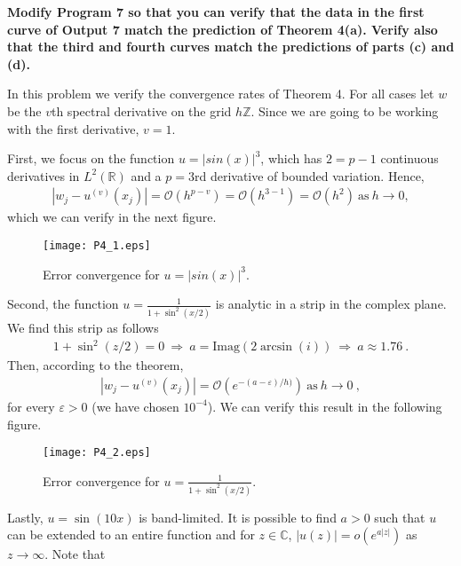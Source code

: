 \textbf{Modify Program 7 so that you can verify that the data in the first curve of Output 7 match the prediction of Theorem 4(a). Verify also that the third and fourth curves match the predictions of parts (c) and (d).}
\newline

In this problem we verify the convergence rates of Theorem 4. For all cases let $w$ be the $v$th spectral derivative on the grid $h\mathbb{Z}$. Since we are going to be working with the first derivative, $v=1$.

First, we focus on the function $u=|sin(x)|^3$, which has $2=p-1$ continuous derivatives in $L^2(\mathbb{R})$ and a $p=3$rd derivative of bounded variation. Hence,
\begin{align*}
|w_j - u^{(v)}(x_j)| = \mathcal{O}(h^{p-v}) = \mathcal{O}(h^{3-1}) = \mathcal{O}(h^{2})~\text{as}~h \rightarrow 0,
\end{align*}
which we can verify in the next figure.

\begin{figure}[H]
\centering
\texttt{[image: P4\_1.eps]}\caption{Error convergence for $u=|sin(x)|^3$.}
\end{figure}

Second, the function $ u = \frac{1}{1+\sin^2(x/2)}$ is analytic in a strip in the complex plane. We find this strip as follows
\begin{align*}
1 + \sin^2(z/2) = 0 ~\Rightarrow ~a = \text{Imag}(2 \arcsin(i))~\Rightarrow~ a \approx 1.76~.
\end{align*}
Then, according to the theorem,
\begin{align*}
|w_j - u^{(v)}(x_j)| = \mathcal{O}\left(e^{-(a-\varepsilon)/h)}\right)~\text{as}~h \rightarrow 0~,
\end{align*}
for every $\varepsilon>0$ (we have chosen $10^{-4}$). We can verify this result in the following figure.
\begin{figure}[H]
\centering
\texttt{[image: P4\_2.eps]}\caption{Error convergence for $ u = \frac{1}{1+\sin^2(x/2)}$.}
\end{figure}

Lastly, $u = \sin(10x)$ is band-limited. It is possible to find $a >0$ such that $u$ can be extended to an entire function and for $z \in \mathbb{C}$, $|u(z)| = o(e^{a|z|})$ as $z \rightarrow \infty$. Note that

